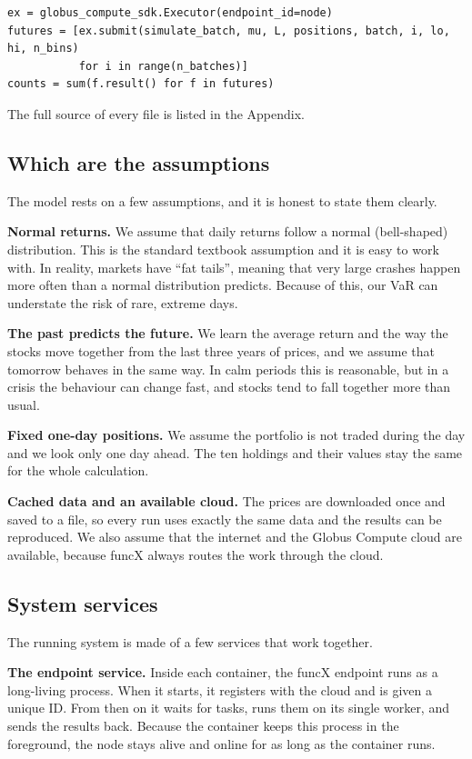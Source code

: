 \documentclass[11pt,a4paper]{article}
\begin{document}
\begin{lstlisting}[style=py]
ex = globus_compute_sdk.Executor(endpoint_id=node)
futures = [ex.submit(simulate_batch, mu, L, positions, batch, i, lo, hi, n_bins)
           for i in range(n_batches)]
counts = sum(f.result() for f in futures)
\end{lstlisting}

The full source of every file is listed in the Appendix.

\subsection{Which are the assumptions}

The model rests on a few assumptions, and it is honest to state them clearly.

\textbf{Normal returns.} We assume that daily returns follow a normal (bell-shaped) distribution. This is the standard textbook assumption and it is easy to work with. In reality, markets have ``fat tails'', meaning that very large crashes happen more often than a normal distribution predicts. Because of this, our VaR can understate the risk of rare, extreme days.

\textbf{The past predicts the future.} We learn the average return and the way the stocks move together from the last three years of prices, and we assume that tomorrow behaves in the same way. In calm periods this is reasonable, but in a crisis the behaviour can change fast, and stocks tend to fall together more than usual.

\textbf{Fixed one-day positions.} We assume the portfolio is not traded during the day and we look only one day ahead. The ten holdings and their values stay the same for the whole calculation.

\textbf{Cached data and an available cloud.} The prices are downloaded once and saved to a file, so every run uses exactly the same data and the results can be reproduced. We also assume that the internet and the Globus Compute cloud are available, because funcX always routes the work through the cloud.

\subsection{System services}

The running system is made of a few services that work together.

\textbf{The endpoint service.} Inside each container, the funcX endpoint runs as a long-living process. When it starts, it registers with the cloud and is given a unique ID. From then on it waits for tasks, runs them on its single worker, and sends the results back. Because the container keeps this process in the foreground, the node stays alive and online for as long as the container runs.
\end{document}
